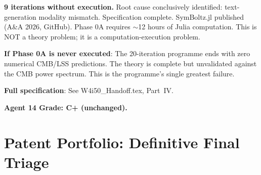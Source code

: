 \documentclass[11pt,a4paper]{article}
\begin{document}
\begin{tcolorbox}[colback=red!5!white, colframe=red!60!black,
  title={Phase 0A: NINTH ITERATION --- Zero Lines of Code}]

\textbf{9 iterations without execution.} Root cause conclusively identified: text-generation modality mismatch. Specification complete. SymBoltz.jl published (A\&A 2026, GitHub). Phase 0A requires $\sim$12 hours of Julia computation. This is NOT a theory problem; it is a computation-execution problem.

\textbf{If Phase 0A is never executed}: The 20-iteration programme ends with zero numerical CMB/LSS predictions. The theory is complete but unvalidated against the CMB power spectrum. This is the programme's single greatest failure.

\textbf{Full specification}: See W4i50\_Handoff.tex, Part~IV.
\end{tcolorbox}

\textbf{Agent 14 Grade: C+ (unchanged).}


\part{Patent Portfolio: Definitive Final Triage}
\label{part:patents}
\end{document}
